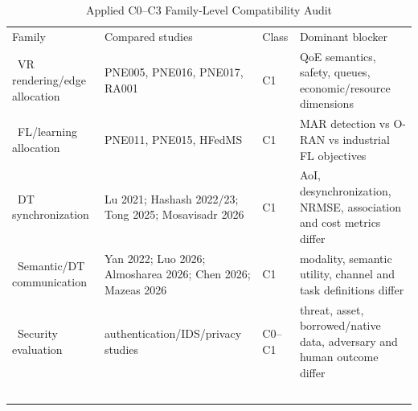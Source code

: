 \begin{table}[H]\centering\caption{Applied C0--C3 Family-Level Compatibility Audit}\label{tab:familycompat}\scriptsize\begin{tabularx}{\columnwidth}{p{}p{}p{}Y}\toprule Family & Compared studies & Class & Dominant blocker \\\ \midrule VR rendering/edge allocation & PNE005, PNE016, PNE017, RA001 & C1 & QoE semantics, safety, queues, economic/resource dimensions \\\ FL/learning allocation & PNE011, PNE015, HFedMS & C1 & MAR detection vs O-RAN vs industrial FL objectives \\\ DT synchronization & Lu 2021; Hashash 2022/23; Tong 2025; Mosavisadr 2026 & C1 & AoI, desynchronization, NRMSE, association and cost metrics differ \\\ Semantic/DT communication & Yan 2022; Luo 2026; Almosharea 2026; Chen 2026; Mazeas 2026 & C1 & modality, semantic utility, channel and task definitions differ \\\ Security evaluation & authentication/IDS/privacy studies & C0--C1 & threat, asset, borrowed/native data, adversary and human outcome differ \\\ \bottomrule\end{tabularx}\end{table}